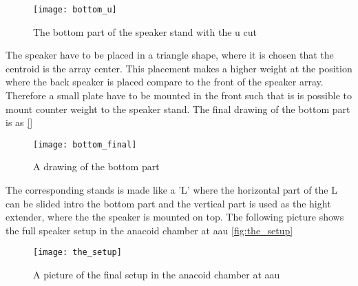  \begin{figure}[H]
	\centering
	\texttt{[image: bottom\_u]}
	\caption{The bottom part of the speaker stand with the u cut}
		\label{fig:botom_u}
\end{figure}

The speaker have to be placed in a triangle shape, where it is chosen that the centroid is the array center. This placement makes a higher weight at the position where the back speaker is placed compare to the front of the speaker array. Therefore a small plate have to be mounted in the front such that is is possible to mount counter weight to the speaker stand. The final drawing of the bottom part is as \autoref{}

  \begin{figure}[H]
	\centering
	\texttt{[image: bottom\_final]}
	\caption{A drawing of the bottom part}
		\label{fig:botom_final}
\end{figure}

The corresponding stands is made like a 'L' where the horizontal part of the L can be slided intro the bottom part and the vertical part is used as the hight extender, where the the speaker is mounted on top. The following picture shows the full speaker setup in the anacoid chamber at \gls{aau} \autoref{fig:the_setup}

  \begin{figure}[H]
	\centering
	\texttt{[image: the\_setup]}
	\caption{A picture of the final setup in the anacoid chamber at \gls{aau}}
		\label{fig:the_setup}
\end{figure}







